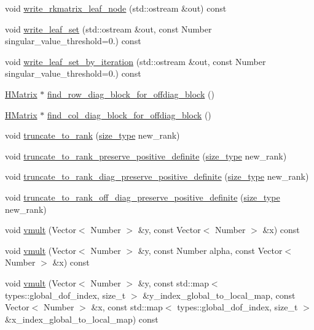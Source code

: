 \begin{DoxyCompactItemize}
\item 
void \hyperlink{classHMatrix_ac2c8ccd5763d3952505741c657b6468c}{write\+\_\+rkmatrix\+\_\+leaf\+\_\+node} (std\+::ostream \&out) const
\item 
void \hyperlink{classHMatrix_aaf0ae0960a40ad78a941aee823e80315}{write\+\_\+leaf\+\_\+set} (std\+::ostream \&out, const Number singular\+\_\+value\+\_\+threshold=0.) const
\item 
void \hyperlink{classHMatrix_aac1e1ddbfeb133520dcd50c0174aab8d}{write\+\_\+leaf\+\_\+set\+\_\+by\+\_\+iteration} (std\+::ostream \&out, const Number singular\+\_\+value\+\_\+threshold=0.) const
\item 
\hyperlink{classHMatrix}{H\+Matrix} $\ast$ \hyperlink{classHMatrix_a1da518d5ca7e685e3e787f58dcad4e61}{find\+\_\+row\+\_\+diag\+\_\+block\+\_\+for\+\_\+offdiag\+\_\+block} ()
\item 
\hyperlink{classHMatrix}{H\+Matrix} $\ast$ \hyperlink{classHMatrix_a1ab763860706b9cbef8f5e73d995f29a}{find\+\_\+col\+\_\+diag\+\_\+block\+\_\+for\+\_\+offdiag\+\_\+block} ()
\item 
void \hyperlink{classHMatrix_a64be687cacd167efc12b892aa154dcd3}{truncate\+\_\+to\+\_\+rank} (\hyperlink{classHMatrix_a5ca8dc549783d38371a01ecd621ecb34}{size\+\_\+type} new\+\_\+rank)
\item 
void \hyperlink{classHMatrix_a15191d30e94d5f54d30c5f612f606ce1}{truncate\+\_\+to\+\_\+rank\+\_\+preserve\+\_\+positive\+\_\+definite} (\hyperlink{classHMatrix_a5ca8dc549783d38371a01ecd621ecb34}{size\+\_\+type} new\+\_\+rank)
\item 
void \hyperlink{classHMatrix_a93834ac1b8a659dc2b81cd3af1dea997}{truncate\+\_\+to\+\_\+rank\+\_\+diag\+\_\+preserve\+\_\+positive\+\_\+definite} (\hyperlink{classHMatrix_a5ca8dc549783d38371a01ecd621ecb34}{size\+\_\+type} new\+\_\+rank)
\item 
void \hyperlink{classHMatrix_a58c40b6db50fe3dbbf230f951d346b9c}{truncate\+\_\+to\+\_\+rank\+\_\+off\+\_\+diag\+\_\+preserve\+\_\+positive\+\_\+definite} (\hyperlink{classHMatrix_a5ca8dc549783d38371a01ecd621ecb34}{size\+\_\+type} new\+\_\+rank)
\item 
void \hyperlink{classHMatrix_aa11b5761aba86606effd14b4bdf31912}{vmult} (Vector$<$ Number $>$ \&y, const Vector$<$ Number $>$ \&x) const
\item 
void \hyperlink{classHMatrix_a21ca2a043c8a02a531d5d08437356310}{vmult} (Vector$<$ Number $>$ \&y, const Number alpha, const Vector$<$ Number $>$ \&x) const
\item 
void \hyperlink{classHMatrix_a690927f0810d85d08f0ab2239e405ffe}{vmult} (Vector$<$ Number $>$ \&y, const std\+::map$<$ types\+::global\+\_\+dof\+\_\+index, size\+\_\+t $>$ \&y\+\_\+index\+\_\+global\+\_\+to\+\_\+local\+\_\+map, const Vector$<$ Number $>$ \&x, const std\+::map$<$ types\+::global\+\_\+dof\+\_\+index, size\+\_\+t $>$ \&x\+\_\+index\+\_\+global\+\_\+to\+\_\+local\+\_\+map) const

\end{DoxyCompactItemize}
